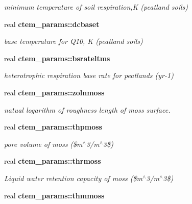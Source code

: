\begin{DoxyCompactItemize}
\begin{DoxyCompactList}\small\item\em minimum temperature of soil respiration,K (peatland soils) \end{DoxyCompactList}\item 
\hypertarget{namespacectem__params_a720de170a379ed4cd4fa79b3568adeee}{}real {\bfseries ctem\+\_\+params\+::dcbaset}\label{namespacectem__params_a720de170a379ed4cd4fa79b3568adeee}

\begin{DoxyCompactList}\small\item\em base temperature for Q10, K (peatland soils) \end{DoxyCompactList}\item 
\hypertarget{namespacectem__params_aba3dc779db095e9a91c71fa765ce42c5}{}real {\bfseries ctem\+\_\+params\+::bsrateltms}\label{namespacectem__params_aba3dc779db095e9a91c71fa765ce42c5}

\begin{DoxyCompactList}\small\item\em heterotrophic respiration base rate for peatlands (yr-\/1) \end{DoxyCompactList}\item 
\hypertarget{namespacectem__params_a2ccf9899714e74accc20f0ac2effd33c}{}real {\bfseries ctem\+\_\+params\+::zolnmoss}\label{namespacectem__params_a2ccf9899714e74accc20f0ac2effd33c}

\begin{DoxyCompactList}\small\item\em natual logarithm of roughness length of moss surface. \end{DoxyCompactList}\item 
\hypertarget{namespacectem__params_a1f10073e9d589f7bc3240bec9f3d6516}{}real {\bfseries ctem\+\_\+params\+::thpmoss}\label{namespacectem__params_a1f10073e9d589f7bc3240bec9f3d6516}

\begin{DoxyCompactList}\small\item\em pore volume of moss (\$m$^\wedge$3/m$^\wedge$3\$) \end{DoxyCompactList}\item 
\hypertarget{namespacectem__params_aecb4d53264357fb5440a4bb71e5e1c2f}{}real {\bfseries ctem\+\_\+params\+::thrmoss}\label{namespacectem__params_aecb4d53264357fb5440a4bb71e5e1c2f}

\begin{DoxyCompactList}\small\item\em Liquid water retention capacity of moss (\$m$^\wedge$3/m$^\wedge$3\$) \end{DoxyCompactList}\item 
\hypertarget{namespacectem__params_a1ec880bc9f809448914c2f7cf94d4493}{}real {\bfseries ctem\+\_\+params\+::thmmoss}\label{namespacectem__params_a1ec880bc9f809448914c2f7cf94d4493}


\end{DoxyCompactItemize}

